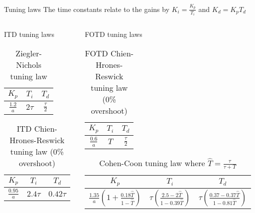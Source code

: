 \documentclass[9pt]{beamer-control}
\begin{document}
\begin{frame}{Tuning laws}
	\centering
	The time constants relate to the gains by $K_i= \frac{K_p}{T_i}$ and $K_d = K_p T_d$\\
	\vfill
	
	\begin{columns}
		\begin{column}{0.5\textwidth}
			ITD tuning laws
			\begin{table}
				\centering
				\begin{tabular}{|c|c|c|}
					\hline
					$K_p$ & $T_i$ & $T_d$\\
					\hline
					$\frac{1.2}{a}$ & $2\tau$ & $\frac{\tau}{2}$\\
					\hline	
				\end{tabular}
				\caption{Ziegler-Nichols tuning law}
			\end{table}
			
			\begin{table}
				\centering
				\begin{tabular}{|c|c|c|}
					\hline
					$K_p$ & $T_i$ & $T_d$\\
					\hline
					$\frac{0.95}{a}$ & $2.4 \tau$ & $0.42 \tau$\\
					\hline	
				\end{tabular}
				\caption{ITD Chien-Hrones-Reswick tuning law (0\% overshoot)}
			\end{table}
		\end{column}
		\begin{column}{0.5\textwidth} 
			
			FOTD tuning laws
			\begin{table}
				\centering
				\begin{tabular}{|c|c|c|}
					\hline
					$K_p$ & $T_i$ & $T_d$\\
					\hline
					$\frac{0.6}{a}$ & $T$ & $\frac{\tau}{2}$\\
					\hline	
				\end{tabular}
				\caption{FOTD Chien-Hrones-Reswick tuning law (0\% overshoot)}
			\end{table}
			
			\begin{table}
				\centering
				\begin{tabular}{|c|c|c|}
					\hline
					$K_p$ & $T_i$ & $T_d$\\
					\hline
					\tiny{$\frac{1.35}{a}\left(1 + \frac{0.18 \hat{T}}{1-\hat{T}} \right)$} & \tiny{$ \tau\left( \frac{2.5-2\hat{T}}{1-0.39\hat{T}} \right) $} & \tiny{$\tau \left( \frac{0.37-0.37\hat{T}}{1-0.81\hat{T}} \right)$}\\
					\hline	
				\end{tabular}
				\caption{Cohen-Coon tuning law where $\hat{T}=\frac{\tau}{\tau+T}$}
			\end{table}
		\end{column}
	\end{columns}
	
	
\end{frame}
\end{document}
